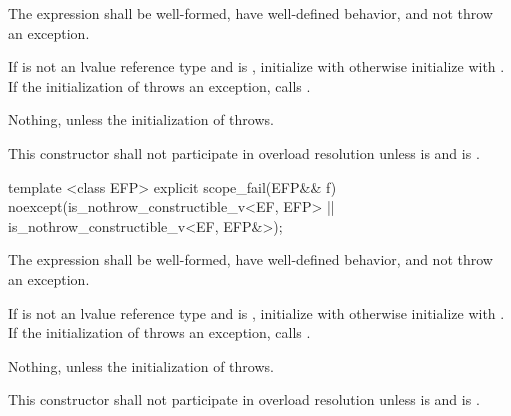 \documentclass[ebook,11pt,article]{memoir}
\begin{document}
\begin{itemdescr}

\pnum
\requires 
The expression  shall be well-formed, have well-defined behavior, and not throw an exception.


\pnum
\effects If  is not an lvalue reference type and  is , initialize   with  otherwise initialize  with . 
If the initialization of  throws an exception, calls .

\pnum
\throws Nothing, unless the initialization of  throws.

\pnum
\remarks
This constructor shall not participate in overload resolution unless
 is 
and  is .
\end{itemdescr}


\begin{itemdecl}
template <class EFP>
explicit
scope_fail(EFP&& f) noexcept(is_nothrow_constructible_v<EF, EFP>
                          || is_nothrow_constructible_v<EF, EFP&>);

\end{itemdecl}

\begin{itemdescr}
\pnum
\requires 
The expression  shall be well-formed, have well-defined behavior, and not throw an exception.

\pnum
\effects If  is not an lvalue reference type and  is , initialize   with  otherwise initialize  with . If the initialization of  throws an exception, calls .

\pnum
\throws Nothing, unless the initialization of  throws.

\pnum
\remarks This constructor shall not participate in overload resolution unless 
 is 
and  is .
\end{itemdescr}
\end{document}
